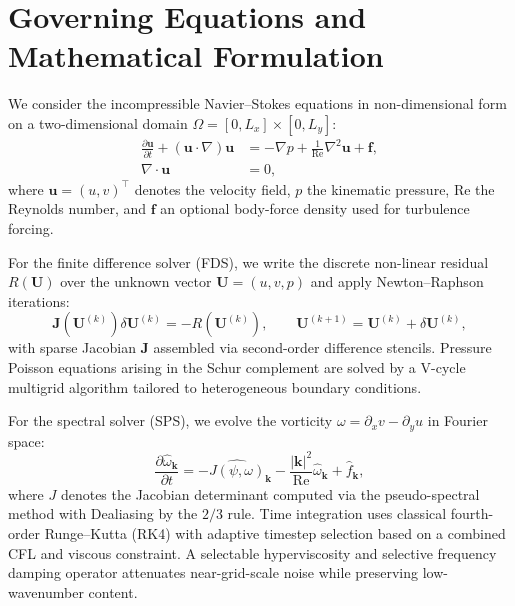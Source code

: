 \documentclass[final,onefignum,onetabnum]{siamonline220329}
\newcommand{\Rey}{\mathrm{Re}}
\begin{document}
\section{Governing Equations and Mathematical Formulation}
We consider the incompressible Navier--Stokes equations in non-dimensional form on a two-dimensional domain $\Omega = [0,L_x] \times [0,L_y]$:
\begin{subequations}
\begin{align}
  \frac{\partial \mathbf{u}}{\partial t} + (\mathbf{u} \cdot \nabla)\mathbf{u} &= -\nabla p + \frac{1}{\Rey}\nabla^2 \mathbf{u} + \mathbf{f}, \label{eq:momentum}\\
  \nabla \cdot \mathbf{u} &= 0, \label{eq:continuity}
\end{align}
\end{subequations}
where $\mathbf{u} = (u, v)^\top$ denotes the velocity field, $p$ the kinematic pressure, $\Rey$ the Reynolds number, and $\mathbf{f}$ an optional body-force density used for turbulence forcing.

For the finite difference solver (FDS), we write the discrete non-linear residual $R(\mathbf{U})$ over the unknown vector $\mathbf{U} = (u, v, p)$ and apply Newton--Raphson iterations:
\begin{equation}
  \mathbf{J}(\mathbf{U}^{(k)}) \delta \mathbf{U}^{(k)} = -R(\mathbf{U}^{(k)}), \qquad \mathbf{U}^{(k+1)} = \mathbf{U}^{(k)} + \delta \mathbf{U}^{(k)},
\end{equation}
with sparse Jacobian $\mathbf{J}$ assembled via second-order difference stencils.
Pressure Poisson equations arising in the Schur complement are solved by a V-cycle multigrid algorithm tailored to heterogeneous boundary conditions.

For the spectral solver (SPS), we evolve the vorticity $\omega = \partial_x v - \partial_y u$ in Fourier space:
\begin{equation}
  \frac{\partial \hat{\omega}_{\mathbf{k}}}{\partial t} = -\widehat{J(\psi,\omega)}_{\mathbf{k}} - \frac{|\mathbf{k}|^2}{\Rey} \hat{\omega}_{\mathbf{k}} + \hat{f}_{\mathbf{k}},
\end{equation}
where $J$ denotes the Jacobian determinant computed via the pseudo-spectral method with Dealiasing by the $2/3$ rule.
Time integration uses classical fourth-order Runge--Kutta (RK4) with adaptive timestep selection based on a combined CFL and viscous constraint.
A selectable hyperviscosity and selective frequency damping operator attenuates near-grid-scale noise while preserving low-wavenumber content.
\end{document}
